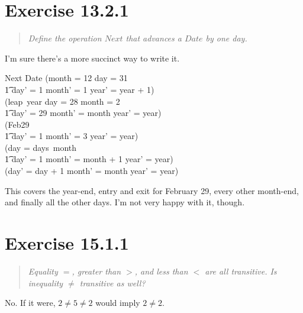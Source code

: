 \documentclass[10pt]{article}
\begin{document}
\section{Exercise 13.2.1}
\begin{quote}
  {\it
    Define the operation $Next$ that advances a $Date$ by one day.
  }
\end{quote}

I'm sure there's a more succinct way to write it.

\begin{spec}
  \begin{schema}{Next}
    \Delta Date
    \where
    (month = 12 \land day = 31 \land \\
    \t1 day' = 1 \land month' = 1 \land year' = year + 1) \lor \\
    (leap\ year \land day = 28 \land month = 2 \land \\
    \t1 day' = 29 \land month' = month \land year' = year) \lor \\
    (Feb29 \land \\
    \t1 day' = 1 \land month' = 3 \land year' = year) \lor \\
    (day = days\ month \land \\
    \t1 day' = 1 \land month' = month + 1 \land year' = year) \lor \\
    (day' = day + 1 \land month' = month \land year' = year)
  \end{schema}
\end{spec}
This covers the year-end, entry and exit for February 29, every other month-end, and finally all the
other days.  I'm not very happy with it, though.



\section{Exercise 15.1.1}
\begin{quote}
  {\it
    Equality $=$, greater than $>$, and less than $<$ are all transitive. Is inequality $\neq$
    transitive as well?
  }
\end{quote}

No.  If it were, $2 \neq 5 \neq 2$ would imply $2 \neq 2$.
\end{document}
